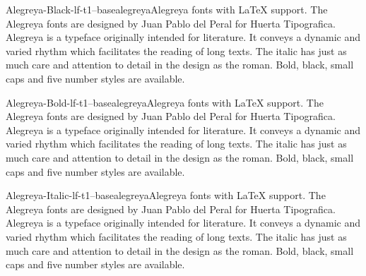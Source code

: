 \documentclass{ddltxtyp}
\begin{document}
\begin{package}{Alegreya-Black-lf-t1--base}{alegreya}{Alegreya fonts with {\LaTeX} support.}
The Alegreya fonts are designed by Juan Pablo del Peral for
Huerta Tipografica. Alegreya is a typeface originally intended
for literature. It conveys a dynamic and varied rhythm which
facilitates the reading of long texts. The italic has just as
much care and attention to detail in the design as the roman.
Bold, black, small caps and five number styles are available.
\end{package}
\begin{package}{Alegreya-Bold-lf-t1--base}{alegreya}{Alegreya fonts with {\LaTeX} support.}
The Alegreya fonts are designed by Juan Pablo del Peral for
Huerta Tipografica. Alegreya is a typeface originally intended
for literature. It conveys a dynamic and varied rhythm which
facilitates the reading of long texts. The italic has just as
much care and attention to detail in the design as the roman.
Bold, black, small caps and five number styles are available.
\end{package}
\begin{package}{Alegreya-Italic-lf-t1--base}{alegreya}{Alegreya fonts with {\LaTeX} support.}
The Alegreya fonts are designed by Juan Pablo del Peral for
Huerta Tipografica. Alegreya is a typeface originally intended
for literature. It conveys a dynamic and varied rhythm which
facilitates the reading of long texts. The italic has just as
much care and attention to detail in the design as the roman.
Bold, black, small caps and five number styles are available.
\end{package}
\end{document}

